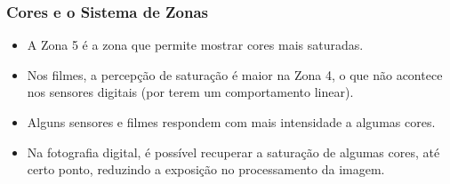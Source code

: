 \begin{frame}
\begin{center}
    \end{center}
\end{frame}

\begin{frame}
    \frametitle{Cores e o Sistema de Zonas}
    \begin{itemize}
      \item A Zona 5 é a zona que permite mostrar cores mais saturadas.
      \item Nos filmes, a percepção de saturação é maior na Zona 4, o que não acontece nos sensores
      digitais (por terem um comportamento linear).
      \item Alguns sensores e filmes respondem com mais intensidade a algumas cores.
      \item Na fotografia digital, é possível recuperar a saturação de algumas cores,
      até certo ponto, reduzindo a exposição no processamento da imagem.
    \end{itemize}
\end{frame}

